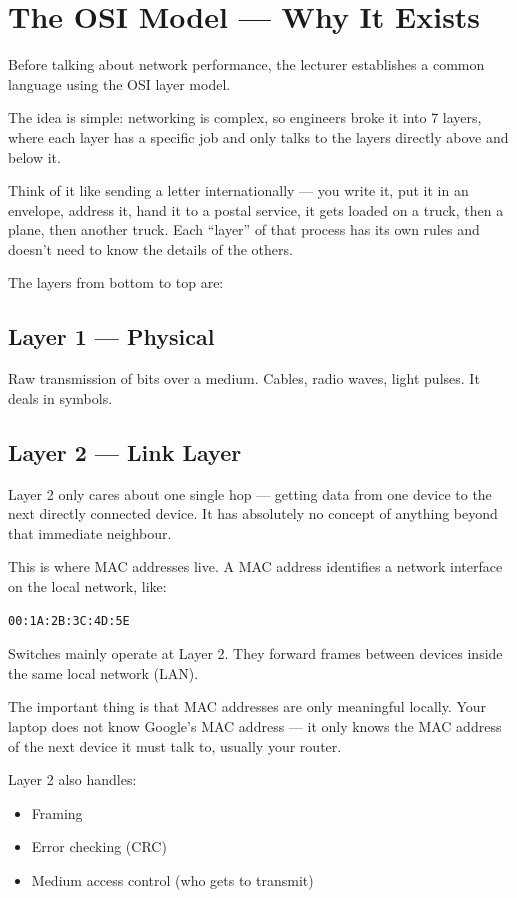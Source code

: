 \clearpage
\section*{The OSI Model --- Why It Exists}

Before talking about network performance, the lecturer establishes a common language using the OSI layer model.

The idea is simple: networking is complex, so engineers broke it into 7 layers, where each layer has a specific job and only talks to the layers directly above and below it.

Think of it like sending a letter internationally --- you write it, put it in an envelope, address it, hand it to a postal service, it gets loaded on a truck, then a plane, then another truck. Each ``layer'' of that process has its own rules and doesn't need to know the details of the others.

The layers from bottom to top are:

\subsection*{Layer 1 --- Physical}

Raw transmission of bits over a medium. Cables, radio waves, light pulses. It deals in symbols.

\subsection*{Layer 2 --- Link Layer}

Layer 2 only cares about one single hop --- getting data from one device to the next directly connected device. It has absolutely no concept of anything beyond that immediate neighbour.

This is where MAC addresses live. A MAC address identifies a network interface on the local network, like:

\begin{verbatim}
00:1A:2B:3C:4D:5E
\end{verbatim}

Switches mainly operate at Layer 2. They forward frames between devices inside the same local network (LAN).

The important thing is that MAC addresses are only meaningful locally. Your laptop does not know Google's MAC address --- it only knows the MAC address of the next device it must talk to, usually your router.

Layer 2 also handles:
\begin{itemize}
    \item Framing
    \item Error checking (CRC)
    \item Medium access control (who gets to transmit)
\end{itemize}

